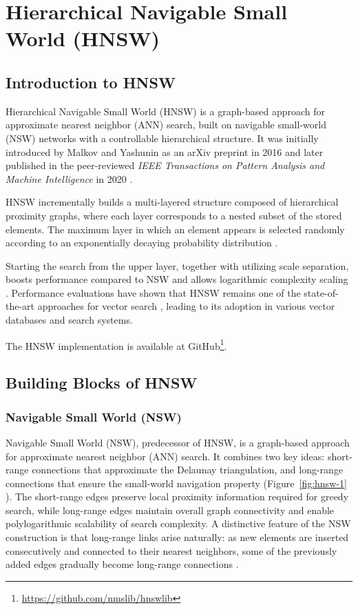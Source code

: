 \section{Hierarchical Navigable Small World (HNSW)}

\subsection{Introduction to HNSW}

Hierarchical Navigable Small World (HNSW) is a graph-based approach for approximate nearest neighbor (ANN) search, built on navigable small-world (NSW) networks with a controllable hierarchical structure. It was initially introduced by Malkov and Yashunin as an arXiv preprint in 2016 \cite{Malkov-Yashunin-2016} and later published in the peer-reviewed \textit{IEEE Transactions on Pattern Analysis and Machine Intelligence} in 2020 \cite{Malkov-Yashunin-2020}.

HNSW incrementally builds a multi-layered structure composed of hierarchical proximity graphs, where each layer corresponds to a nested subset of the stored elements. The maximum layer in which an element appears is selected randomly according to an exponentially decaying probability distribution \cite{Malkov-Yashunin-2016}.

Starting the search from the upper layer, together with utilizing scale separation, boosts performance compared to NSW and allows logarithmic complexity scaling \cite{Malkov-Yashunin-2016}. Performance evaluations have shown that HNSW remains one of the state-of-the-art approaches for vector search \cite{erikbern-ann-benchmarks}, leading to its adoption in various vector databases and search systems.

The HNSW implementation is available at GitHub\footnote{\url{https://github.com/nmslib/hnswlib}}.

\subsection{Building Blocks of HNSW}

\subsubsection{Navigable Small World (NSW)}

Navigable Small World (NSW), predecessor of HNSW, is a graph-based approach for approximate nearest neighbor (ANN) search. It combines two key ideas: short-range connections that approximate the Delaunay triangulation, and long-range connections that ensure the small-world navigation property (Figure~\ref{fig:hnsw-1} \cite{Malkov-Ponomarenko-Logvinov-Krylov-2014}). The short-range edges preserve local proximity information required for greedy search, while long-range edges maintain overall graph connectivity and enable polylogarithmic scalability of search complexity. A distinctive feature of the NSW construction is that long-range links arise naturally: as new elements are inserted consecutively and connected to their nearest neighbors, some of the previously added edges gradually become long-range connections \cite{Malkov-Ponomarenko-Logvinov-Krylov-2014}.


